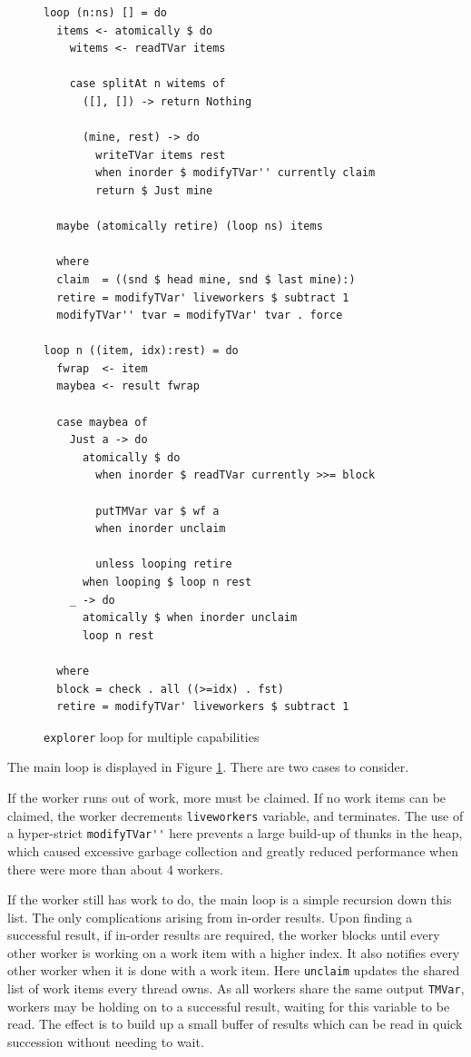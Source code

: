 \begin{figure}[t]
  \centering
  \begin{verbatim}
loop (n:ns) [] = do
  items <- atomically $ do
    witems <- readTVar items

    case splitAt n witems of
      ([], []) -> return Nothing

      (mine, rest) -> do
        writeTVar items rest
        when inorder $ modifyTVar'' currently claim
        return $ Just mine

  maybe (atomically retire) (loop ns) items

  where
  claim  = ((snd $ head mine, snd $ last mine):)
  retire = modifyTVar' liveworkers $ subtract 1
  modifyTVar'' tvar = modifyTVar' tvar . force

loop n ((item, idx):rest) = do
  fwrap  <- item
  maybea <- result fwrap

  case maybea of
    Just a -> do
      atomically $ do
        when inorder $ readTVar currently >>= block

        putTMVar var $ wf a
        when inorder unclaim

        unless looping retire
      when looping $ loop n rest
    _ -> do
      atomically $ when inorder unclaim
      loop n rest

  where
  block = check . all ((>=idx) . fst)
  retire = modifyTVar' liveworkers $ subtract 1
  \end{verbatim}
  \caption{\texttt{explorer} loop for multiple capabilities}
  \label{fig:impl-explorern}
\end{figure}

The main loop is displayed in Figure \ref{fig:impl-explorern}. There
are two cases to consider.

If the worker runs out of work, more must be claimed. If no work items
can be claimed, the worker decrements \verb|liveworkers| variable, and
terminates. The use of a hyper-strict \verb|modifyTVar''| here
prevents a large build-up of thunks in the heap, which caused
excessive garbage collection and greatly reduced performance when
there were more than about 4 workers.

If the worker still has work to do, the main loop is a simple
recursion down this list. The only complications arising from in-order
results. Upon finding a successful result, if in-order results are
required, the worker blocks until every other worker is working on a
work item with a higher index. It also notifies every other worker
when it is done with a work item. Here \verb|unclaim| updates the
shared list of work items every thread owns. As all workers share the
same output \verb|TMVar|, workers may be holding on to a successful
result, waiting for this variable to be read. The effect is to build
up a small buffer of results which can be read in quick succession
without needing to wait.

